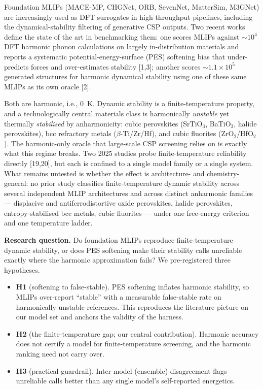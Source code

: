 \documentclass{article}
\begin{document}
Foundation MLIPs (MACE-MP, CHGNet, ORB, SevenNet, MatterSim, M3GNet) are increasingly used as DFT surrogates in high-throughput pipelines, including the dynamical-stability filtering of generative CSP outputs. Two recent works define the state of the art in benchmarking them: one scores MLIPs against $\sim\!10^4$ DFT harmonic phonon calculations on largely in-distribution materials and reports a systematic potential-energy-surface (PES) softening bias that under-predicts forces and over-estimates stability [1,3]; another scores $\sim\!1.1\times10^5$ generated structures for harmonic dynamical stability using one of these same MLIPs as its own oracle [2].

Both are harmonic, i.e., 0~K. Dynamic stability is a finite-temperature property, and a technologically central materials class is harmonically \emph{unstable} yet thermally \emph{stabilised} by anharmonicity: cubic perovskites (SrTiO$_3$, BaTiO$_3$, halide perovskites), bcc refractory metals ($\beta$-Ti/Zr/Hf), and cubic fluorites (ZrO$_2$/HfO$_2$). The harmonic-only oracle that large-scale CSP screening relies on is exactly what this regime breaks. Two 2025 studies probe finite-temperature reliability directly [19,20], but each is confined to a single model family or a single system. What remains untested is whether the effect is architecture- and chemistry-general: no prior study classifies finite-temperature dynamic stability across several independent MLIP architectures and across distinct anharmonic families --- displacive and antiferrodistortive oxide perovskites, halide perovskites, entropy-stabilised bcc metals, cubic fluorites --- under one free-energy criterion and one temperature ladder.

\textbf{Research question.} Do foundation MLIPs reproduce finite-temperature dynamic stability, or does PES softening make their stability calls unreliable exactly where the harmonic approximation fails? We pre-registered three hypotheses.

\begin{itemize}[leftmargin=*,itemsep=1pt,topsep=2pt]
\item \textbf{H1} (softening to false-stable). PES softening inflates harmonic stability, so MLIPs over-report ``stable'' with a measurable false-stable rate on harmonically-unstable references. This reproduces the literature picture on our model set and anchors the validity of the harness.
\item \textbf{H2} (the finite-temperature gap; our central contribution). Harmonic accuracy does not certify a model for finite-temperature screening, and the harmonic ranking need not carry over.
\item \textbf{H3} (practical guardrail). Inter-model (ensemble) disagreement flags unreliable calls better than any single model's self-reported energetics.
\end{itemize}
\end{document}
